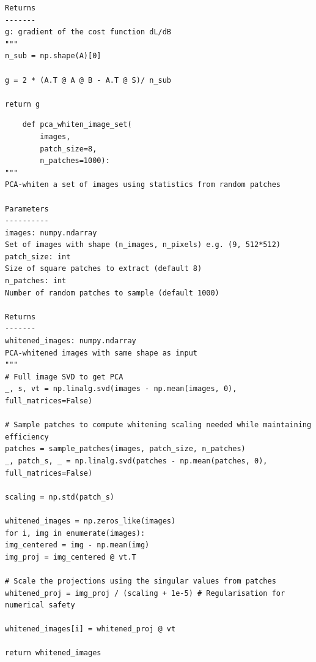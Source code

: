 \documentclass[11pt, twocolumn]{article}
\begin{document}
\begin{appendix}
\begin{lstlisting}
Returns
-------
g: gradient of the cost function dL/dB
"""    
n_sub = np.shape(A)[0]

g = 2 * (A.T @ A @ B - A.T @ S)/ n_sub

return g
\end{lstlisting}

\begin{lstlisting}
    def pca_whiten_image_set(
        images, 
        patch_size=8, 
        n_patches=1000):
"""
PCA-whiten a set of images using statistics from random patches

Parameters
----------
images: numpy.ndarray
Set of images with shape (n_images, n_pixels) e.g. (9, 512*512)
patch_size: int
Size of square patches to extract (default 8)
n_patches: int
Number of random patches to sample (default 1000)

Returns
-------
whitened_images: numpy.ndarray
PCA-whitened images with same shape as input
"""
# Full image SVD to get PCA
_, s, vt = np.linalg.svd(images - np.mean(images, 0), full_matrices=False)

# Sample patches to compute whitening scaling needed while maintaining efficiency
patches = sample_patches(images, patch_size, n_patches)
_, patch_s, _ = np.linalg.svd(patches - np.mean(patches, 0), full_matrices=False)

scaling = np.std(patch_s)

whitened_images = np.zeros_like(images)
for i, img in enumerate(images):
img_centered = img - np.mean(img)
img_proj = img_centered @ vt.T

# Scale the projections using the singular values from patches
whitened_proj = img_proj / (scaling + 1e-5) # Regularisation for numerical safety

whitened_images[i] = whitened_proj @ vt

return whitened_images
\end{lstlisting}


\end{appendix}
\end{document}
